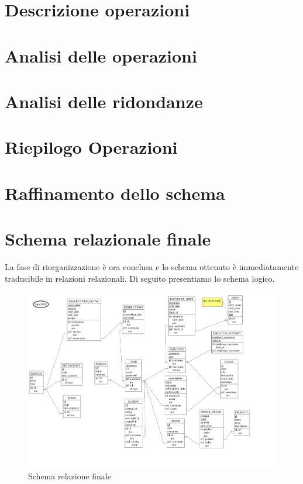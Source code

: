 \documentclass[a4paper,12pt]{report}
\begin{document}
\section{Descrizione operazioni}
\section{Analisi delle operazioni}
\section{Analisi delle ridondanze}
\section{Riepilogo Operazioni}

\section{Raffinamento dello schema}

\section{Schema relazionale finale}
La fase di riorganizzazione è ora conclusa e lo schema ottenuto è
immediatamente traducibile in relazioni relazionali. Di seguito
presentiamo lo schema logico.

\begin{figure}[H]
  \centering
  \includegraphics[width=\textwidth, trim=0 0 0 0]{./schemas/logic.pdf}
  \caption{Schema relazione finale}
  \label{fig:schema-relazione}
\end{figure}
\newpage
\end{document}

